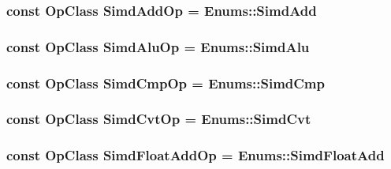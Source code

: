 \label{op__class_8hh_aafe77005165f9045b7b7bf43400de080}
\hypertarget{op__class_8hh_a51335c0e8449d014a427823c0a408834}{
\subsubsection[{SimdAddOp}]{\setlength{\rightskip}{0pt plus 5cm}const OpClass {\bf SimdAddOp} = Enums::SimdAdd}}
\label{op__class_8hh_a51335c0e8449d014a427823c0a408834}
\hypertarget{op__class_8hh_a8e6e42ad37a2d396f3a64e233a31660e}{
\subsubsection[{SimdAluOp}]{\setlength{\rightskip}{0pt plus 5cm}const OpClass {\bf SimdAluOp} = Enums::SimdAlu}}
\label{op__class_8hh_a8e6e42ad37a2d396f3a64e233a31660e}
\hypertarget{op__class_8hh_a0c6df51ab6734480ccc23de38ee1f2c1}{
\subsubsection[{SimdCmpOp}]{\setlength{\rightskip}{0pt plus 5cm}const OpClass {\bf SimdCmpOp} = Enums::SimdCmp}}
\label{op__class_8hh_a0c6df51ab6734480ccc23de38ee1f2c1}
\hypertarget{op__class_8hh_a6c7a22b0557b5dd725f3629deb4b14cf}{
\subsubsection[{SimdCvtOp}]{\setlength{\rightskip}{0pt plus 5cm}const OpClass {\bf SimdCvtOp} = Enums::SimdCvt}}
\label{op__class_8hh_a6c7a22b0557b5dd725f3629deb4b14cf}
\hypertarget{op__class_8hh_af5d28e472a47193ce4cfab8dd3938d7a}{
\subsubsection[{SimdFloatAddOp}]{\setlength{\rightskip}{0pt plus 5cm}const OpClass {\bf SimdFloatAddOp} = Enums::SimdFloatAdd}}
